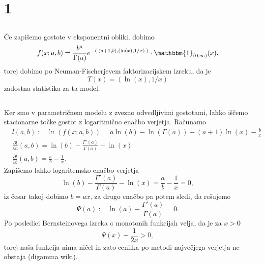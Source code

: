 \documentclass[ letterpaper, titlepage, fleqn]{article}
\newcommand{\scalar}[1]{\langle\;#1\;\rangle}
\newcommand{\ind}{\mathbbm{1}}
\begin{document}
\section{1}

\subsection{}
Če zapišemo gostote v eksponentni obliki, dobimo
$$f(x; a,b) = \frac{b^a}{\Gamma(a)} e^{-\scalar{(a+1, b), (\ln(x), 1/x)}} \cdot \ind_{(0,\infty)}(x),$$
torej dobimo po Neuman-Fischerjevem faktorizacijskem izreku, da je
$$T(x) = (\ln(x), 1/x)$$
zadostna statistika za ta model.

\subsection{}
Ker smo v parametričnem modelu z zvezno odvedljivimi gostotami, lahko iščemo stacionarne točke gostot 
z logaritmično enačbo verjetja. Računamo
\begin{equation*}
\begin{aligned}
&l(a,b) := \ln(f(x; a,b)) = a\ln(b) - \ln(\Gamma(a)) - (a+1)\ln(x) - \frac{b}{x} \\
&\frac{\partial l}{\partial a}(a,b) = \ln(b) - \frac{\Gamma'(a)}{\Gamma(a)} - \ln(x) \\
&\frac{\partial l}{\partial b}(a,b) = \frac{a}{b} - \frac{1}{x}.
\end{aligned}
\end{equation*}
Zapišemo lahko logaritemsko enačbo verjetja
$$\ln(b) - \frac{\Gamma'(a)}{\Gamma(a)} - \ln(x) = \frac{a}{b} - \frac{1}{x} = 0,$$
iz česar takoj dobimo $b = ax$, za drugo enačbo pa potem sledi, da rešujemo
$$\Psi(a) := \ln(a) - \frac{\Gamma'(a)}{\Gamma(a)} = 0.$$
Po posledici Bernsteinovega izreka o monotonih funkcijah velja, da je za $x > 0$
$$\Psi(x) - \frac{1}{2x} > 0,$$
torej naša funkcija nima ničel in zato cenilka po metodi največjega verjetja ne obstaja (digamma wiki).
\end{document}
